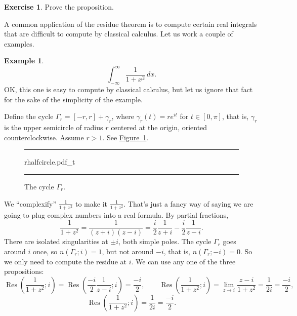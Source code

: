 \documentclass[12pt,openany]{book}
\newcommand{\myquote}[1]{``#1''}
\theoremstyle{plain}
\theoremstyle{remark}
\theoremstyle{definition}
\newenvironment{exbox}{%
    \def\FrameCommand{\vrule width 1pt \relax\hspace{10pt}}%
    \MakeFramed{\advance\hsize-\width\FrameRestore}%
}{%
    \endMakeFramed
}
\newenvironment{myfig}{%
\begin{figure}[h!t]
\noindent\rule{\textwidth}{0.5pt}\vspace{12pt}\par\centering}%
{\par\noindent\rule{\textwidth}{0.5pt}
\end{figure}}
\theoremstyle{exercise}
\newtheorem{exercise}{Exercise}[section]
\theoremstyle{example}
\newtheorem{example}[thm]{Example}
\newcommand{\figureref}[1]{\hyperref[#1]{Figure~\ref*{#1}}}
\begin{document}
\begin{exbox}
\begin{exercise}
Prove the proposition.
\end{exercise}
\end{exbox}

A common application of the residue theorem is to compute certain real
integrals that are difficult to compute by classical calculus.  Let us work
a couple of examples.

\begin{example}
\begin{equation*}
\int_{-\infty}^\infty \frac{1}{1+x^2} \, dx .
\end{equation*}
OK\@, this one is easy to compute by classical calculus, but let us ignore
that fact for the sake of the simplicity of the example.

Define the cycle $\Gamma_r = [-r,r] + \gamma_r$, where $\gamma_r(t) =
re^{it}$ for $t \in [0,\pi]$, that is, $\gamma_r$ is the upper semicircle
of radius $r$ centered at the origin, oriented counterclockwise.
Assume $r > 1$.
See \figureref{fig:rhalfcircle}.

\begin{myfig}
{rhalfcircle.pdf_t}
\caption{The cycle $\Gamma_r$.\label{fig:rhalfcircle}}
\end{myfig}

We \myquote{complexify}
$\frac{1}{1+x^2}$ to make it $\frac{1}{1+z^2}$.
That's just a fancy way of saying we are going to plug complex numbers
into a real formula.
By partial fractions,
\begin{equation*}
\frac{1}{1+z^2} = \frac{1}{(z+i)(z-i)} =
\frac{i}{2} \frac{1}{z+i} - 
\frac{i}{2} \frac{1}{z-i} .
\end{equation*}
There are isolated singularities at $\pm i$, both simple poles.  The cycle
$\Gamma_r$ goes around $i$ once, so $n(\Gamma_r;i) = 1$,
but not around $-i$, that is, $n(\Gamma_r;-i) = 0$.
So we only need to compute
the residue at $i$.  We can use any one of the three propositions:
\begin{equation*}
\operatorname{Res}\left(\frac{1}{1+z^2};i\right) =
\operatorname{Res}\left(
\frac{-i}{2} \frac{1}{z-i};
i\right) = \frac{-i}{2} ,
\qquad
\operatorname{Res}\left(\frac{1}{1+z^2};i\right) =
\lim_{z \to i} \frac{z-i}{1+z^2}
=
\frac{1}{2i} = \frac{-i}{2},
\end{equation*}
\begin{equation*}
\operatorname{Res}\left(\frac{1}{1+z^2};i\right) =
\frac{1}{2i} =
\frac{-i}{2} .
\end{equation*}


\end{example}
\end{document}
